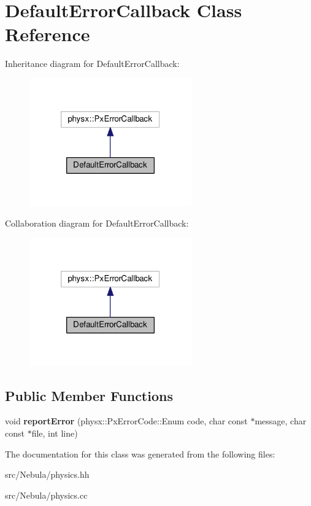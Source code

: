 \hypertarget{classDefaultErrorCallback}{\section{Default\-Error\-Callback Class Reference}
\label{classDefaultErrorCallback}
}


Inheritance diagram for Default\-Error\-Callback\-:
\nopagebreak
\begin{figure}[H]
\begin{center}
\leavevmode
\includegraphics[width=198pt]{classDefaultErrorCallback__inherit__graph}
\end{center}
\end{figure}


Collaboration diagram for Default\-Error\-Callback\-:
\nopagebreak
\begin{figure}[H]
\begin{center}
\leavevmode
\includegraphics[width=198pt]{classDefaultErrorCallback__coll__graph}
\end{center}
\end{figure}
\subsection*{Public Member Functions}
\begin{DoxyCompactItemize}
\item 
\hypertarget{classDefaultErrorCallback_ae95118f6a45b47a1b72af9417f80d84e}{void {\bfseries report\-Error} (physx\-::\-Px\-Error\-Code\-::\-Enum code, char const $\ast$message, char const $\ast$file, int line)}\label{classDefaultErrorCallback_ae95118f6a45b47a1b72af9417f80d84e}

\end{DoxyCompactItemize}


The documentation for this class was generated from the following files\-:\begin{DoxyCompactItemize}
\item 
src/\-Nebula/physics.\-hh\item 
src/\-Nebula/physics.\-cc\end{DoxyCompactItemize}

